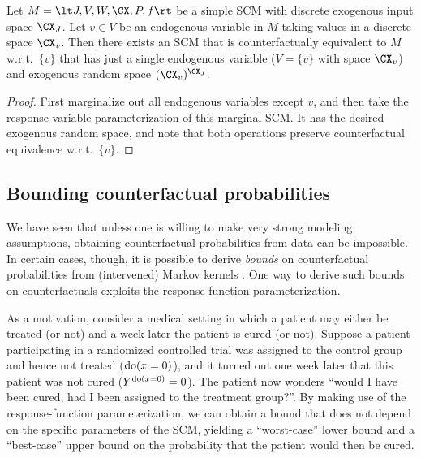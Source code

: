\begin{Cor}\label{cor:counterfactual_equivalence_response_functions}
  Let $M = \lt J, V, W, \CX, P, f \rt$ be a simple SCM with discrete exogenous input space $\CX_J$.
  Let $v \in V$ be an endogenous variable in $M$ taking values in a discrete space $\CX_v$.
  Then there exists an SCM that is counterfactually equivalent to $M$ w.r.t.\ $\{v\}$ that has
  just a single endogenous variable ($V=\{v\}$ with space $\CX_v$) and exogenous random space $(\CX_v)^{\CX_J}$.
\end{Cor}
\begin{proof}
  First marginalize out all endogenous variables except $v$, and then take the response variable parameterization of this marginal SCM.
  It has the desired exogenous random space, and note that both operations preserve counterfactual equivalence w.r.t.\ $\{v\}$.
\end{proof}

\subsection{Bounding counterfactual probabilities}

We have seen that unless one is willing to make very strong modeling assumptions, obtaining counterfactual probabilities from data can be impossible.
In certain cases, though, it is possible to derive \emph{bounds} on counterfactual probabilities from (intervened) Markov kernels \cite{BalkePearl1994b}.
One way to derive such bounds on counterfactuals exploits the response function parameterization.

As a motivation, consider a medical setting in which a patient may either be treated (or not) and a week later the patient is cured (or not).
Suppose a patient participating in a randomized controlled trial was assigned to the control group and hence not treated ($\operatorname{do}(x=0)$), and it turned out one week later that this patient was not cured ($Y^{\operatorname{do}(x=0)}=0$).
The patient now wonders ``would I have been cured, had I been assigned to the treatment group?''.
By making use of the response-function parameterization, we can obtain a bound that does not depend on the specific parameters of the SCM,
yielding a ``worst-case'' lower bound and a ``best-case'' upper bound on the probability that the patient would then be cured.

